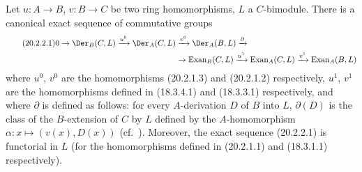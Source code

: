 \begin{theorem}[20.2.2]
\label{0.20.2.2}
Let $u:A\to B$, $v:B\to C$ be two ring homomorphisms, $L$ a $C$-bimodule.
There is a canonical exact sequence of commutative groups
\begin{align}
\tag{20.2.2.1}
  \label{0.20.2.2.1}
  0\to\Der_B(C,L)\xrightarrow{u^0}\Der_A(C,L)&\xrightarrow{v^0}\Der_A(B,L)\xrightarrow{\partial} \\
  &\to\operatorname{Exan}_B(C,L)\xrightarrow{u^1}\operatorname{Exan}_A(C,L)\xrightarrow{v^1}\operatorname{Exan}_A(B,L) \notag
\end{align}
where $u^0$, $v^0$ are the homomorphisms \textup{(}20.2.1.3\textup{)} and \textup{(}20.2.1.2\textup{)} respectively, $u^1$, $v^1$ are the homomorphisms defined in (18.3.4.1) and (18.3.3.1) respectively, and where $\partial$ is defined as follows: for every $A$-derivation $D$ of $B$ into $L$, $\partial(D)$ is the class of the $B$-extension of $C$ by $L$ defined by the $A$-homomorphism $\alpha:x\mapsto(v(x),D(x))$ \textup{(}cf.\ \textup{)}.
Moreover, the exact sequence \textup{(}20.2.2.1\textup{)} is functorial in $L$ \textup{(}for the homomorphisms defined in \textup{(}20.2.1.1\textup{)} and \textup{(}18.3.1.1\textup{)} respectively\textup{)}.
\end{theorem}

